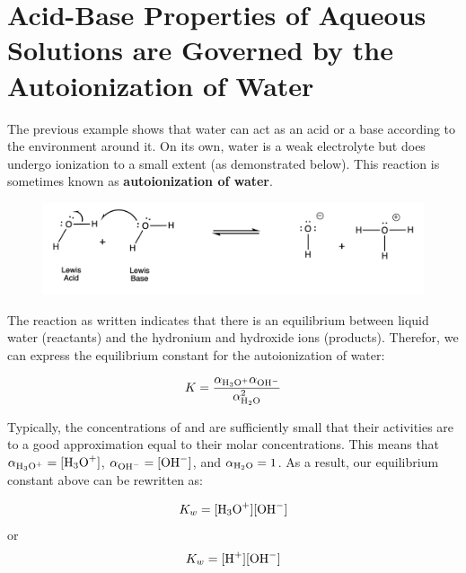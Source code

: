 \documentclass[12pt]{article}
\begin{document}
\section{Acid-Base Properties of Aqueous Solutions are Governed by the Autoionization of Water}

\noindent The previous example shows that water can act as an acid or a base according to the environment around it. On its own, water is a weak electrolyte but does undergo ionization to a small extent (as demonstrated below). This reaction is sometimes known as \textbf{autoionization of water}.

\begin{figure}[h] 
    \begin{centering}
	\includegraphics[width=\textwidth,trim={0 2cm 0 0},clip]{Figures/H2O-auto.png}
    \end{centering}
\end{figure}  


\noindent The reaction as written indicates that there is an equilibrium between liquid water (reactants) and the hydronium and hydroxide ions (products). Therefor, we can express the equilibrium constant for the autoionization of water:

\begin{equation}
    K = \frac{\alpha_{\ce{H3O+}}\alpha_{\ce{OH-}}}{\alpha_{\ce{H2O}}^{2}}
\end{equation}

\noindent Typically, the concentrations of  and  are sufficiently small that their activities are to a good approximation equal to their molar concentrations. This means that $\alpha_{\ce{H3O+}} = [\ce{H3O+}]$, $\alpha_{\ce{OH-}} = [\ce{OH-}]$, and $\alpha_{\ce{H2O}} = 1$. As a result, our equilibrium constant above can be rewritten as:

\begin{equation}
    K_{w} = [\ce{H3O+}][\ce{OH-}] \\
\end{equation}
\noindent or
\begin{equation}
\label{eq:K_w_expression}
    K_{w} = [\ce{H+}][\ce{OH-}]
\end{equation}
\end{document}
